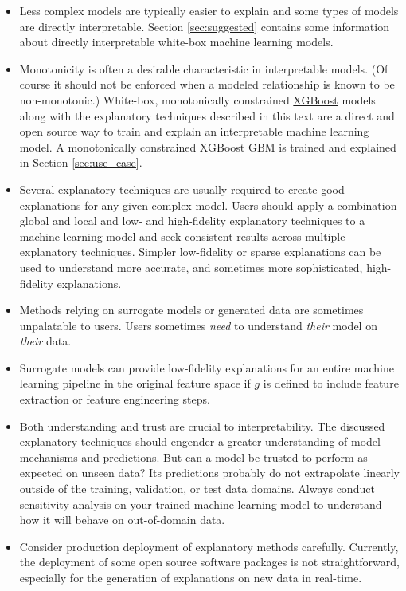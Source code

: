 \documentclass[11pt]{asaproc}
\begin{document}
\begin{itemize}	
	
	\item Less complex models are typically easier to explain and some types of models are directly interpretable. Section \ref{sec:suggested} contains some information about directly interpretable white-box machine learning models.
	
	\item Monotonicity is often a desirable characteristic in interpretable models. (Of course it should not be enforced when a modeled relationship is known to be non-monotonic.) White-box, monotonically constrained \href{https://github.com/dmlc/xgboost}{XGBoost} models along with the explanatory techniques described in this text are a direct and open source way to train and explain an interpretable machine learning model. A monotonically constrained XGBoost GBM is trained and explained in Section \ref{sec:use_case}.
	
	\item Several explanatory techniques are usually required to create good explanations for any given complex model. Users should apply a combination global and local and low- and high-fidelity explanatory techniques to a machine learning model and seek consistent results across multiple explanatory techniques. Simpler low-fidelity or sparse explanations can be used to understand more accurate, and sometimes more sophisticated, high-fidelity explanations.  

	\item Methods relying on surrogate models or generated data are sometimes unpalatable to users. Users sometimes \textit{need} to understand \textit{their} model on \textit{their} data.
	
	\item Surrogate models can provide low-fidelity explanations for an entire machine learning pipeline in the original feature space if $g$ is defined to include feature extraction or feature engineering steps.
	
	\item Both understanding and trust are crucial to interpretability. The discussed explanatory techniques should engender a greater understanding of model mechanisms and predictions. But can a model be trusted to perform as expected on unseen data? Its predictions probably do not extrapolate linearly outside of the training, validation, or test data domains. Always conduct sensitivity analysis on your trained machine learning model to understand how it will behave on out-of-domain data.
	
	\item Consider production deployment of explanatory methods carefully. Currently, the deployment of some open source software packages is not straightforward, especially for the generation of explanations on new data in real-time.
	
\end{itemize}
\end{document}
